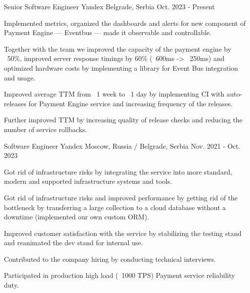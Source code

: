 

\begin{cventries}

  \cventry
    {Senior Software Engineer} %
    {Yandex} %
    {Belgrade, Serbia} %
    {Oct. 2023 - Present} %
    {
      \begin{cvitems} %
        \item {Implemented metrics, organized the dashboards and alerts for new component of Payment Engine — Eventbus — made it observable and controllable.}
        \item {Together with the team we improved the capacity of the payment engine by ~50\%, improved server response timings by 60\% (~600ms -> ~250ms) and optimized hardware costs by implementing a library for Event Bus integration and usage.}
        \item {Improved average TTM from ~1 week to ~1 day by implementing CI with auto-releases for Payment Engine service and increasing frequency of the releases.}
        \item {Further improved TTM by increasing quality of release checks and reducing the number of service rollbacks.}
      \end{cvitems}
    }
  \cventry
    {Software Engineer} %
    {Yandex} %
    {Moscow, Russia / Belgrade, Serbia} %
    {Nov. 2021 - Oct. 2023} %
    {
      \begin{cvitems} %
        \item {Got rid of infrastructure risks by integrating the service into more standard, modern and supported infrastructure systems and tools.}
        \item {Got rid of infrastructure risks and improved performance by getting rid of the bottleneck by transferring a large collection to a cloud database without a downtime (implemented our own custom ORM).}
        \item {Improved customer satisfaction with the service by stabilizing the testing stand and reanimated the dev stand for internal use.}
        \item {Contributed to the company hiring by conducting technical interviews.}
        \item {Participated in production high load (~1000 TPS) Payment service reliability duty.}
      \end{cvitems}
}


\end{cventries}
